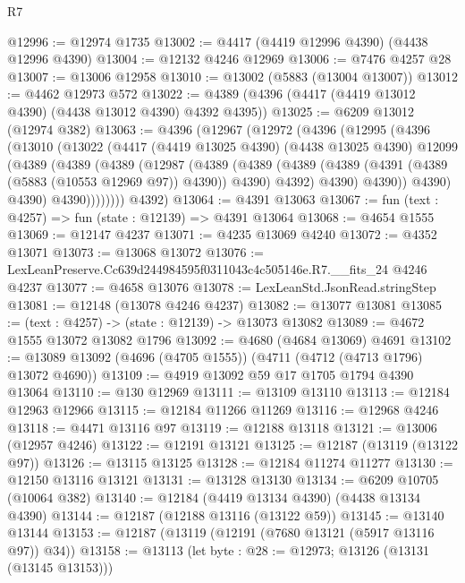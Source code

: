 \begin{lexlean}{R7}
\begin{coremodule}
@12996 := @12974 @1735
@13002 := @4417 (@4419 @12996 @4390) (@4438 @12996 @4390)
@13004 := @12132 @4246 @12969
@13006 := @7476 @4257 @28
@13007 := @13006 @12958
@13010 := @13002 (@5883 (@13004 @13007))
@13012 := @4462 @12973 @572
@13022 := @4389 (@4396 (@4417 (@4419 @13012 @4390) (@4438 @13012 @4390) @4392 @4395))
@13025 := @6209 @13012 (@12974 @382)
@13063 := @4396
    (@12967
      (@12972
        (@4396
          (@12995
            (@4396
              (@13010
                (@13022
                  (@4417
                    (@4419 @13025 @4390)
                    (@4438 @13025 @4390)
                    @12099
                    (@4389
                      (@4389
                        (@4389
                          (@12987
                            (@4389
                              (@4389
                                (@4389
                                  (@4389 (@4391 (@4389 (@5883 (@10553 @12969 @97)) @4390)) @4390)
                                  @4392)
                                @4390)
                              @4390))
                          @4390)
                        @4390)
                      @4390))))))))
      @4392)
@13064 := @4391 @13063
@13067 := fun (text : @4257) => fun (state : @12139) => @4391 @13064
@13068 := @4654 @1555
@13069 := @12147 @4237
@13071 := @4235 @13069 @4240
@13072 := @4352 @13071
@13073 := @13068 @13072
@13076 := LexLeanPreserve.Cc639d244984595f0311043c4c505146e.R7.__fits_24 @4246 @4237
@13077 := @4658 @13076
@13078 := LexLeanStd.JsonRead.stringStep
@13081 := @12148 (@13078 @4246 @4237)
@13082 := @13077 @13081
@13085 := (text : @4257) -> (state : @12139) -> @13073 @13082
@13089 := @4672 @1555 @13072 @13082 @1796
@13092 := @4680 (@4684 @13069) @4691
@13102 := @13089 @13092 (@4696 (@4705 @1555)) (@4711 (@4712 (@4713 @1796) @13072 @4690))
@13109 := @4919 @13092 @59 @17 @1705 @1794 @4390 @13064
@13110 := @130 @12969
@13111 := @13109 @13110
@13113 := @12184 @12963 @12966
@13115 := @12184 @11266 @11269
@13116 := @12968 @4246
@13118 := @4471 @13116 @97
@13119 := @12188 @13118
@13121 := @13006 (@12957 @4246)
@13122 := @12191 @13121
@13125 := @12187 (@13119 (@13122 @97))
@13126 := @13115 @13125
@13128 := @12184 @11274 @11277
@13130 := @12150 @13116 @13121
@13131 := @13128 @13130
@13134 := @6209 @10705 (@10064 @382)
@13140 := @12184 (@4419 @13134 @4390) (@4438 @13134 @4390)
@13144 := @12187 (@12188 @13116 (@13122 @59))
@13145 := @13140 @13144
@13153 := @12187 (@13119 (@12191 (@7680 @13121 (@5917 @13116 @97)) @34))
@13158 := @13113 (let byte : @28 := @12973; @13126 (@13131 (@13145 @13153)))

\end{coremodule}
\end{lexlean}
